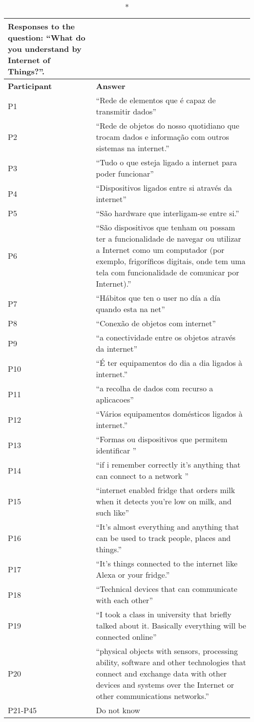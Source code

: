 \begin{longtable}{p{3cm} p{12cm}}
    \caption*{Responses to the question: ``What do you understand by Internet of Things?''.}\label{table:survey_s6_q1}\\
    \hline
    \textbf{Participant} & \textbf{Answer} \\
    \hline
    P1 & ``Rede de elementos que é capaz de transmitir dados'' \\
    \hline
    P2 & ``Rede de objetos do nosso quotidiano que trocam dados e informação com outros sistemas na internet.'' \\
    \hline
    P3 & ``Tudo o que esteja ligado a internet para poder funcionar'' \\
    \hline
    P4 & ``Dispositivos ligados entre si através da internet'' \\
    \hline
    P5 & ``São hardware que interligam-se entre si.'' \\
    \hline
    P6 & ``São dispositivos que tenham ou possam ter a funcionalidade de navegar ou utilizar a Internet como um computador (por exemplo, frigoríficos digitais, onde tem uma tela com funcionalidade de comunicar por Internet).'' \\
    \hline
    P7 & ``Hábitos que ten o user no día a día quando esta na net'' \\
    \hline
    P8 & ``Conexão de objetos com internet'' \\
    \hline
    P9 & ``a conectividade entre os objetos através da internet'' \\
    \hline
    P10 & ``É ter equipamentos do dia a dia ligados à internet.'' \\
    \hline
    P11 & ``a recolha  de dados com recurso a aplicacoes'' \\
    \hline
    P12 & ``Vários equipamentos domésticos ligados à internet.'' \\
    \hline
    P13 & ``Formas ou dispositivos que permitem identificar '' \\
    \hline
    P14 & ``if i remember correctly it's anything that can connect to a network '' \\
    \hline
    P15 & ``internet enabled fridge that orders milk when it detects you're low on milk, and such like'' \\
    \hline
    P16 & ``It's almost everything and anything that can be used to track people, places and things.'' \\
    \hline
    P17 & ``It's things connected to the internet like Alexa or your fridge.'' \\
    \hline
    P18 & ``Technical devices that can communicate with each other'' \\
    \hline
    P19 & ``I took a class in university that briefly talked about it. Basically everything will be connected online'' \\
    \hline
    P20 & ``physical objects with sensors, processing ability, software and other technologies that connect and exchange data with other devices and systems over the Internet or other communications networks.'' \\
    \hline
    P21-P45 & Do not know \\
    \hline
\end{longtable}

